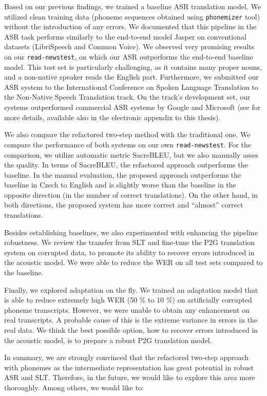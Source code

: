 Based on our previous findings, we trained a baseline ASR translation model. We utilized clean training data (phoneme sequences obtained using \texttt{phonemizer} tool) without the introduction of any errors. We documented that this pipeline in the ASR task performs similarly to the end-to-end model Jasper on conventional datasets (LibriSpeech and Common Voice). We observed very promising results on our \texttt{read-newstest}, on which our ASR outperforms the end-to-end baseline model. This test set is particularly challenging, as it contains many proper nouns, and a non-native speaker reads the English part. Furthermore, we submitted our ASR system to the International Conference on Spoken Language Translation to the Non-Native Speech Translation track. On the track's development set, our systems outperformed commercial ASR systems by Google and Microsoft (see  for more details, available also in the electronic appendix to this thesis).

We also compare the refactored two-step method with the traditional one. We compare the performance of both systems on our own \texttt{read-newstest}. For the comparison, we utilize automatic metric SacreBLEU, but we also manually asses the quality. In terms of SacreBLEU, the refactored approach outperforms the baseline. In the manual evaluation, the proposed approach outperforms the baseline in Czech to English and is slightly worse than the baseline in the opposite direction (in the number of correct translations). On the other hand, in both directions, the proposed system has more correct and ``almost'' correct translations.

Besides establishing baselines, we also experimented with enhancing the pipeline robustness. We review the transfer from SLT and fine-tune the P2G translation system on corrupted data, to promote its ability to recover errors introduced in the acoustic model. We were able to reduce the WER on all test sets compared to the baseline.

Finally, we explored adaptation on the fly. We trained an adaptation model that is able to reduce extremely high WER (50 \% to 10 \%) on artificially corrupted phoneme transcripts. However, we were unable to obtain any enhancement on real transcripts. A probable cause of this is the extreme variance in errors in the real data. We think the best possible option, how to recover errors introduced in the acoustic model, is to prepare a robust P2G translation model. 

In summary, we are strongly convinced that the refactored two-step approach with phonemes as the intermediate representation has great potential in robust ASR and SLT. Therefore, in the future, we would like to explore this area more thoroughly. Among others, we would like to:

